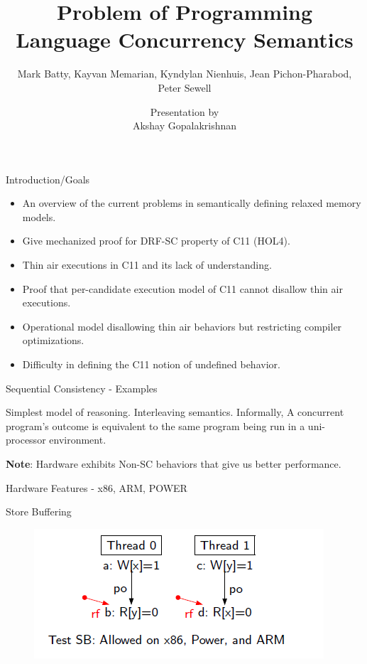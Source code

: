 \documentclass{beamer}
\title{Problem of Programming Language Concurrency Semantics}
\subtitle{Mark Batty, Kayvan Memarian, Kyndylan Nienhuis, Jean Pichon-Pharabod, Peter Sewell}
\author{Presentation by \\ Akshay Gopalakrishnan}
\institute{McGill University}
\begin{document}
    
    \begin{frame}

        \titlepage
    \end{frame}

    \begin{frame}{Introduction/Goals}

        \begin{itemize}
            \item An overview of the current problems in semantically defining relaxed memory models.
            \item Give mechanized proof for DRF-SC property of C11 (HOL4).
            \item Thin air executions in C11 and its lack of understanding.
            \item Proof that per-candidate execution model of C11 cannot disallow thin air executions. 
            \item Operational model disallowing thin air behaviors but restricting compiler optimizations. 
            \item Difficulty in defining the C11 notion of undefined behavior.
        \end{itemize}
        

    \end{frame}

    \begin{frame}{Sequential Consistency - Examples}
        
        Simplest model of reasoning. 
        Interleaving semantics. 
        Informally,
        \center A concurrent program's outcome is equivalent to the same program being run in a uni-processor environment. 

        \textbf{Note}: Hardware exhibits Non-SC behaviors that give us better performance. 

    \end{frame}


    \begin{frame}{Hardware Features - x86, ARM, POWER}
        
        Store Buffering
        \begin{figure}
            \centering
            \includegraphics[scale=0.7]{SB.PNG}
        \end{figure}
        
    \end{frame}
\end{document}
